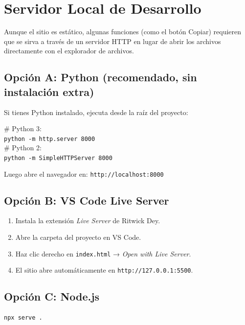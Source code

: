 \documentclass[12pt, a4paper]{article}
\newcommand{\archivo}[1]{\texttt{\textcolor{cpAccent}{#1}}}
\begin{document}
\section{Servidor Local de Desarrollo}

Aunque el sitio es estático, algunas funciones (como el botón Copiar)
requieren que se sirva a través de un servidor HTTP en lugar de abrir los
archivos directamente con el explorador de archivos.

\subsection{Opción A: Python (recomendado, sin instalación extra)}

Si tienes Python instalado, ejecuta desde la raíz del proyecto:

\begin{cajaCodigo}
\# Python 3:\\
\texttt{python -m http.server 8000}\\[4pt]
\# Python 2:\\
\texttt{python -m SimpleHTTPServer 8000}
\end{cajaCodigo}

Luego abre el navegador en: \texttt{http://localhost:8000}

\subsection{Opción B: VS Code Live Server}

\begin{enumerate}[leftmargin=1.5em]
    \item Instala la extensión \textit{Live Server} de Ritwick Dey.
    \item Abre la carpeta del proyecto en VS Code.
    \item Haz clic derecho en \archivo{index.html} → \textit{Open with Live Server}.
    \item El sitio abre automáticamente en \texttt{http://127.0.0.1:5500}.
\end{enumerate}

\subsection{Opción C: Node.js}

\begin{cajaCodigo}
\texttt{npx serve .}
\end{cajaCodigo}
\end{document}
